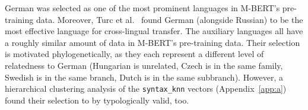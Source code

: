 	German was selected as one of the most prominent languages in M-BERT's pre-training data. Moreover, Turc et al.~\cite{turc-etal-2021-revisiting} found German (alongside Russian) to be the most effective language for cross-lingual transfer. The auxiliary languages all have a roughly similar amount of data in M-BERT's pre-training data. Their selection is motivated phylogenetically, as they each represent a different level of relatedness to German (Hungarian is unrelated, Czech is in the same family, Swedish is in the same branch, Dutch is in the same subbranch). However, a hierarchical clustering analysis of the \texttt{syntax\_knn} vectors (Appendix~\ref{app:a}) found their selection to by typologically valid, too.



